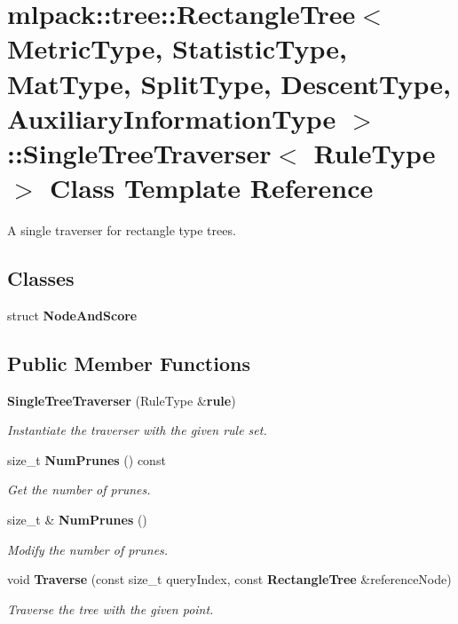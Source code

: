 \section{mlpack\+:\+:tree\+:\+:Rectangle\+Tree$<$ Metric\+Type, Statistic\+Type, Mat\+Type, Split\+Type, Descent\+Type, Auxiliary\+Information\+Type $>$\+:\+:Single\+Tree\+Traverser$<$ Rule\+Type $>$ Class Template Reference}
\label{classmlpack_1_1tree_1_1RectangleTree_1_1SingleTreeTraverser}


A single traverser for rectangle type trees.  


\subsection*{Classes}
\begin{DoxyCompactItemize}
\item 
struct {\bf Node\+And\+Score}
\end{DoxyCompactItemize}
\subsection*{Public Member Functions}
\begin{DoxyCompactItemize}
\item 
{\bf Single\+Tree\+Traverser} (Rule\+Type \&{\bf rule})
\begin{DoxyCompactList}\small\item\em Instantiate the traverser with the given rule set. \end{DoxyCompactList}\item 
size\+\_\+t {\bf Num\+Prunes} () const 
\begin{DoxyCompactList}\small\item\em Get the number of prunes. \end{DoxyCompactList}\item 
size\+\_\+t \& {\bf Num\+Prunes} ()
\begin{DoxyCompactList}\small\item\em Modify the number of prunes. \end{DoxyCompactList}\item 
void {\bf Traverse} (const size\+\_\+t query\+Index, const {\bf Rectangle\+Tree} \&reference\+Node)
\begin{DoxyCompactList}\small\item\em Traverse the tree with the given point. \end{DoxyCompactList}\end{DoxyCompactItemize}
